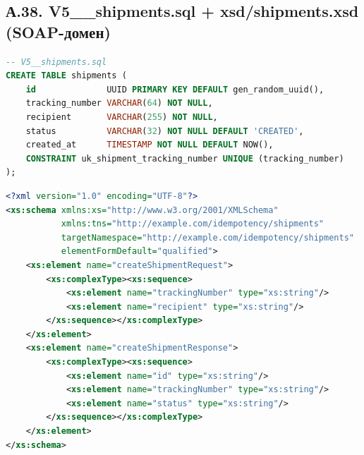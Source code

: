 \subsection*{А.38. V5\_\_shipments.sql + xsd/shipments.xsd (SOAP-домен)}
\begin{lstlisting}[caption={V5 миграция и XSD контракт SOAP}, language=SQL]
-- V5__shipments.sql
CREATE TABLE shipments (
    id              UUID PRIMARY KEY DEFAULT gen_random_uuid(),
    tracking_number VARCHAR(64) NOT NULL,
    recipient       VARCHAR(255) NOT NULL,
    status          VARCHAR(32) NOT NULL DEFAULT 'CREATED',
    created_at      TIMESTAMP NOT NULL DEFAULT NOW(),
    CONSTRAINT uk_shipment_tracking_number UNIQUE (tracking_number)
);
\end{lstlisting}
\begin{lstlisting}[caption={xsd/shipments.xsd}, language=XML]
<?xml version="1.0" encoding="UTF-8"?>
<xs:schema xmlns:xs="http://www.w3.org/2001/XMLSchema"
           xmlns:tns="http://example.com/idempotency/shipments"
           targetNamespace="http://example.com/idempotency/shipments"
           elementFormDefault="qualified">
    <xs:element name="createShipmentRequest">
        <xs:complexType><xs:sequence>
            <xs:element name="trackingNumber" type="xs:string"/>
            <xs:element name="recipient" type="xs:string"/>
        </xs:sequence></xs:complexType>
    </xs:element>
    <xs:element name="createShipmentResponse">
        <xs:complexType><xs:sequence>
            <xs:element name="id" type="xs:string"/>
            <xs:element name="trackingNumber" type="xs:string"/>
            <xs:element name="status" type="xs:string"/>
        </xs:sequence></xs:complexType>
    </xs:element>
</xs:schema>
\end{lstlisting}

